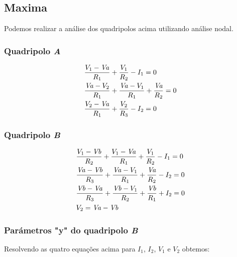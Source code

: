 \documentclass[12pt,twoside, a4paper, twocolumn]{article}
\begin{document}
\subsection{Maxima}




Podemos realizar a análise dos quadripolos acima utilizando análise nodal.


\subsubsection{Quadripolo \emph{A}}


\begin{equation}
    \begin{aligned}
         & {{V_{1}-{\it Va}}\over{R_{1}}}+{{V_{1}}\over{R_{2}}}-I_{1}=0                              \\
         & {{{\it Va}-V_{2}}\over{R_{1}}}+{{{\it Va}-V_{1}}\over{R_{1}}}+{{ {\it Va}}\over{R_{2}}}=0 \\
         & {{V_{2}-{\it Va}}\over{R_{1}}}+{{V_{2}}\over{R_{3}}}-I_{2}=0
    \end{aligned}
\end{equation}


\subsubsection{Quadripolo \emph{B}}


\begin{equation}
    \begin{aligned}
         & {{V_{1}-{\it Vb}}\over{R_{2}}}+{{V_{1}-{\it Va}}\over{R_{1}}}+{{ V_{1}}\over{R_{2}}}-I_{1}=0       \\
         & {{{\it Va}-{\it Vb}}\over{R_{3}}}+{{{\it Va}-V_{1}}\over{R_{1}}}+{{ {\it Va}}\over{R_{2}}}-I_{2}=0 \\
         & {{{\it Vb}-{\it Va}}\over{R_{3}}}+{{{\it Vb}-V_{1}}\over{R_{2}}}+{{ {\it Vb}}\over{R_{1}}}+I_{2}=0 \\
         & V_{2}={\it Va}-{\it Vb}
    \end{aligned}
\end{equation}


\subsubsection{Parámetros "y" do quadripolo \emph{B}}


Resolvendo as quatro equações acima para $I_1$, $I_2$, $V_1$ e $V_2$ obtemos:
\end{document}
